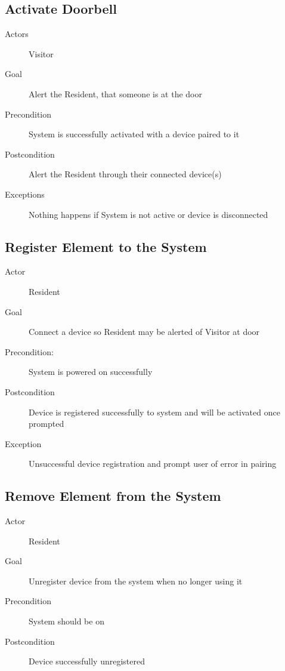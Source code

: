 \subsection{Activate Doorbell}
\begin{description}
\item [Actors] Visitor
\item [Goal] Alert the Resident, that someone is at the door
\item [Precondition] System is successfully activated with a device paired to it
\item [Postcondition] Alert the Resident through their connected device(s)
\item [Exceptions] Nothing happens if System is not active or device is disconnected
\end{description}
\subsection{Register Element to the System}
\begin{description}
\item [Actor] Resident
\item [Goal] Connect a device so Resident may be alerted of Visitor at door
\item [Precondition:]System is powered on successfully
\item [Postcondition] Device is registered successfully to system and will be activated once prompted
\item [Exception] Unsuccessful device registration and prompt user of error in pairing
\end{description}
\subsection{Remove Element from the System}
\begin{description}
\item [Actor] Resident
\item [Goal] Unregister device from the system when no longer using it
\item [Precondition] System should be on
\item [Postcondition] Device successfully unregistered
\end{description}